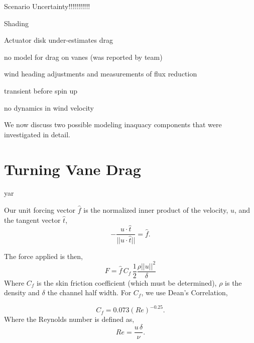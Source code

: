 Scenario Uncertainty!!!!!!!!!!!

Shading

Actuator disk under-estimates drag

no model for drag on vanes (was reported by team)

wind heading adjustments and measurements of flux reduction

transient before spin up

no dynamics in wind velocity

We now discuss two possible modeling inaquacy components that were
investigated in detail. 

\section{Turning Vane Drag}

yar

Our unit forcing vector $\hat f$ is the normalized inner product of the 
velocity, $u$, and the tangent vector $\hat t$, 
\begin{equation}
- \frac{u \cdot \hat t}{|| u \cdot \hat t ||} = \hat f. 
\end{equation}

The force applied is then, 
\begin{equation}
 F = \hat f \, C_f \, \frac{1}{2} \frac{\rho || u ||^2}{\delta}
\end{equation}
Where $C_f$ is the skin friction coefficient (which must be determined),
$\rho $ is the density and $\delta$ the channel half width. 
For $C_f$, we use Dean's Correlation\cite{?}, 

%
%
%
\begin{equation}
 C_f = 0.073 (Re)^{-0.25}. 
\end{equation}
Where the Reynolds number is defined as, 
\begin{equation}
 Re = \frac{u\, \delta}{\nu}.
\end{equation}

